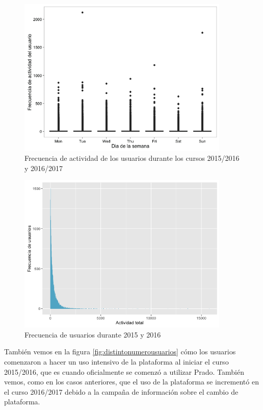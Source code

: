 \begin{figure}[H]
\centering
\includegraphics[width=0.9\textwidth]{../r/frecuenciaactividadusuario}
\caption{Frecuencia de actividad de los usuarios durante los cursos 2015/2016 y 2016/2017}
\label{fig:frecuenciaactividadusuario}
\end{figure}


\begin{figure}[H]
\centering
\includegraphics[width=0.9\textwidth]{../r/frecuenciausuarios}
\caption{Frecuencia de usuarios durante 2015 y 2016}
\label{fig:frecuenciausuarios}
\end{figure}


También vemos en la figura \ref{fig:distintonumerousuarios} cómo los usuarios comenzaron a hacer un uso intensivo de la plataforma al iniciar el curso 2015/2016, que es cuando oficialmente se comenzó a utilizar Prado. También vemos, como en los casos anteriores, que el uso de la plataforma se incrementó en el curso 2016/2017 debido a la campaña de información sobre el cambio de plataforma.



